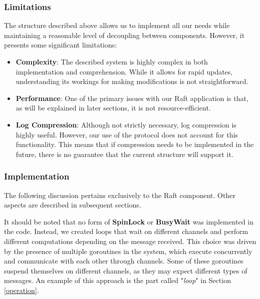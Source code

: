 \subsubsection{Limitations}
The structure described above allows us to implement all our needs while maintaining a 
reasonable level of decoupling between components. However, it presents some significant limitations:
\begin{itemize}
    \item \textbf{Complexity}: The described system is highly complex in both implementation 
      and comprehension. While it allows for rapid updates, understanding its workings 
      for making modifications is not straightforward.
    \item \textbf{Performance}: One of the primary issues with our Raft application is that, 
      as will be explained in later sections, it is not resource-efficient.
    \item \textbf{Log Compression}: Although not strictly necessary, log compression is 
      highly useful. However, our use of the protocol does not account for this functionality. 
      This means that if compression needs to be implemented in the future, there is no 
      guarantee that the current structure will support it.
\end{itemize}
\vspace{3pt}
\subsubsection{Implementation}
The following discussion pertains exclusively to the Raft component. Other aspects are 
described in subsequent sections.

It should be noted that no form of \textbf{SpinLock} or \textbf{BusyWait} was implemented 
in the code. Instead, we created loops that wait on different channels and 
perform different computations depending on the message received. This choice was driven 
by the presence of multiple goroutines in the system, which execute concurrently and 
communicate with each other through channels. Some of these goroutines suspend themselves 
on different channels, as they may expect different types of messages. An example of 
this approach is the part called "\textit{loop}" in Section \ref{operation}.


